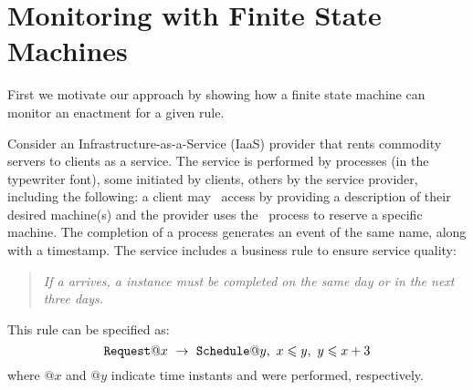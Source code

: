 \section{Monitoring with Finite State Machines}
\label{sec:motiv-finite-state}

First we motivate our approach
by showing how a finite state machine
can monitor an enactment for a given rule.

\begin{examp}\label{example-prompt-schedule}
  Consider an
  Infrastructure-as-a-Service (IaaS) provider that
  rents commodity servers
  to clients as a service.
  The service is performed
  by processes (in the typewriter font),
  some initiated by clients,
  others by the service provider,
  including the following:
  a client may \Request\ access
  by providing a description of their desired machine(s)
  and
  the provider uses the \Schedule\ process
  to reserve a specific machine.
  The completion of a process generates an event of the same name,
  along with a timestamp.
  The service includes a business rule {\PromptSchedule} to ensure service
  quality:
  \begin{quote}
  \em If a {\Request} arrives,
    a {\Schedule} instance must
    be completed on the same day
    or in the next three days.
  \end{quote}
  This rule can be specified as:
  $$
  {\texttt{Request}}@x ~\rightarrow~ {\texttt{Schedule}}@y,~ x \leqslant y,~ y \leqslant x+3
  $$
  where $@x$ and $@y$ indicate time instants {\Request} and {\Schedule}
  were performed, respectively.

\begin{figure}\centering
{}
\end{figure}
\end{examp}
